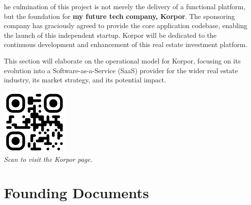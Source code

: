 \begin{tcolorbox}[
    enhanced,
    colback=background!95!white, %
    colframe=primary, %
    boxrule=1pt,
    arc=3mm, 
    outer arc=1mm,
    drop shadow={opacity=0.4, color=secondary}, %
    title={\textbf{\color{white}The Entrepreneurial Leap}}, %
    fonttitle=\bfseries, 
    coltitle=primary, %
    attach boxed title to top center={yshift=-2mm},
    boxed title style={colback=primary, arc=2mm} %
]
he culmination of this project is not merely the delivery of a functional platform, but the foundation for \textbf{my future tech company, Korpor}. The sponsoring company has graciously agreed to provide the core application codebase, enabling the launch of this independent startup. Korpor will be dedicated to the continuous development and enhancement of this real estate investment platform.

This section will elaborate on the operational model for Korpor, focusing on its evolution into a Software-as-a-Service (SaaS) provider for the wider real estate industry, its market strategy, and its potential impact.

\vspace{1em} %
\begin{center}
    \includegraphics[width=0.25\textwidth]{images/korpor-qr.png} \\ %
    \vspace{0.5em}
    \small\textit{Scan to visit the Korpor page.}
\end{center}
\vspace{0.5em} %
\end{tcolorbox}

\section{Founding Documents}

